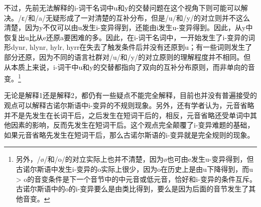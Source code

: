 不过，先前无法解释的i-词干名词中u和y的交替问题在这个视角下则可能可以解决。/ɛ/和/a/无疑形成了一对清楚的互补分布，但是/u/和/y/的对立则并不这么清楚，因为y不仅可以由u发生i-变异得到，还能由i发生u-变异得到。因此，从y中恢复出u比从e还原a要困难的多。因此，在i-词干名词中，一开始发生了i-变异的词形dynr,
hlynr, hylr,
hyrr在失去了触发条件后并没有还原到u；有一些词则发生了部分还原，因为不同的语言社群对/u/和/y/的对立原则的理解程度并不相同。但从本质上来说，i-词干中u和y的交替都指向了双向的互补分布原则，而非单向的音变。\footnote{另外，/ø/和/o/的对立实际上也并不清楚，因为ø也可由e发生u-变异得到，但古诺尔斯语中发生i-变异的o实际上很少，因为o在历史上是由u下降得到，而u
  \textgreater{}
  o的音变条件是下一个音节中的中元音或低元音，恰好和i-变异的条件互斥。古诺尔斯语中的o的i-变异要么是由类比得到，要么是因为后面的音节发生了其他音变。}

无论是解释1还是解释2，都仍有一些疑点不能完全解释，目前也并没有普遍接受的观点可以解释古诺尔斯语中i-变异的不规则现象。另外，还有学者认为，元音省略并不是先发生在长词干后，之后发生在短词干后的，相反，元音省略还受单词中其他因素的影响，反而先发生在短词干后。这个观点完全颠覆了i-变异难题的基础，如果元音省略先发生在短词干后，那么古诺尔斯语的i-变异就是完全规则的现象。
